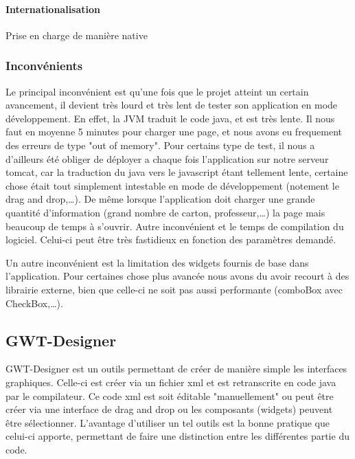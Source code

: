 \paragraph{Internationalisation}
Prise en charge de manière native

\subsubsection{Inconvénients}
Le principal inconvénient est qu'une fois que le projet atteint un certain avancement, il devient très lourd et très lent de tester son application en mode développement. En effet, la JVM traduit le code java, et est très lente. Il nous faut en moyenne 5 minutes pour charger une page, et nous avons eu frequement des erreurs de type "out of memory". Pour certains type de test, il nous a d'ailleurs été obliger de déployer a chaque fois l'application sur notre serveur tomcat, car la traduction du java vers le javascript étant tellement lente, certaine chose était tout simplement intestable en mode de développement (notement le drag and drop,…). De même lorsque l'application doit charger une grande quantité d'information (grand nombre de carton, professeur,…) la page mais beaucoup de temps à s'ouvrir.
Autre inconvénient et le temps de compilation du logiciel. Celui-ci peut être très fastidieux en fonction des paramètres demandé.
	
Un autre inconvénient est la limitation des widgets fournis de base dans l'application. Pour certaines chose plus avancée nous avons du avoir recourt à des librairie externe, bien que celle-ci ne soit pas aussi performante (comboBox avec CheckBox,…).

\subsection{GWT-Designer}
GWT-Designer est un outils permettant de créer de manière simple les interfaces graphiques. Celle-ci est créer via un fichier xml et est retranscrite en code java par le compilateur. Ce code xml est soit éditable "manuellement" ou peut être créer via une interface de drag and drop ou les composants (widgets) peuvent être sélectionner. L'avantage d'utiliser un tel outils est la bonne pratique que celui-ci apporte, permettant de faire une distinction entre les différentes partie du code.


